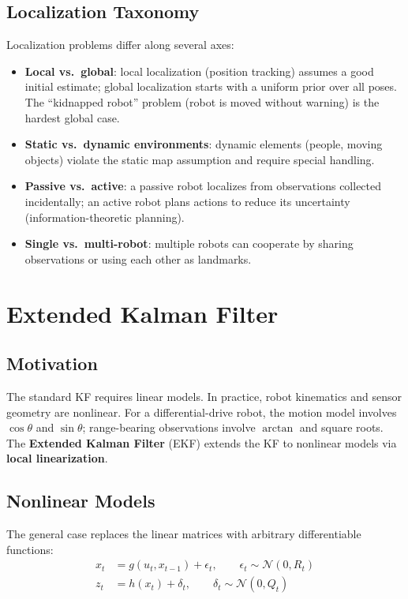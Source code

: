 \documentclass[11pt,a4paper]{article}
\theoremstyle{definition}
\theoremstyle{plain}
\theoremstyle{remark}
\begin{document}
\subsection{Localization Taxonomy}

Localization problems differ along several axes:
\begin{itemize}
    \item \textbf{Local vs.\ global}: local localization (position tracking) assumes a good initial estimate; global localization starts with a uniform prior over all poses. The ``kidnapped robot'' problem (robot is moved without warning) is the hardest global case.
    \item \textbf{Static vs.\ dynamic environments}: dynamic elements (people, moving objects) violate the static map assumption and require special handling.
    \item \textbf{Passive vs.\ active}: a passive robot localizes from observations collected incidentally; an active robot plans actions to reduce its uncertainty (information-theoretic planning).
    \item \textbf{Single vs.\ multi-robot}: multiple robots can cooperate by sharing observations or using each other as landmarks.
\end{itemize}

\section{Extended Kalman Filter}

\subsection{Motivation}

The standard KF requires linear models. In practice, robot kinematics and sensor geometry are nonlinear. For a differential-drive robot, the motion model involves $\cos\theta$ and $\sin\theta$; range-bearing observations involve $\arctan$ and square roots. The \textbf{Extended Kalman Filter} (EKF) extends the KF to nonlinear models via \textbf{local linearization}.

\subsection{Nonlinear Models}

The general case replaces the linear matrices with arbitrary differentiable functions:
\begin{align*}
x_t &= g(u_t, x_{t-1}) + \epsilon_t, \qquad \epsilon_t \sim \mathcal{N}(0, R_t) \\
z_t &= h(x_t) + \delta_t, \qquad \delta_t \sim \mathcal{N}(0, Q_t)
\end{align*}
\end{document}
